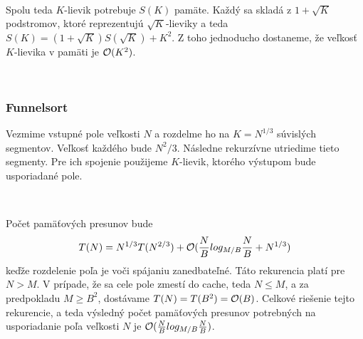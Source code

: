 \

Spolu teda $K$-lievik potrebuje $S(K)$ pamäte. Každý sa skladá z $1+\sqrt{K}$ podstromov, ktoré reprezentujú $\sqrt{K}$-lieviky a teda $S(K) = (1+\sqrt{K})S(\sqrt{K}) + K^2$. Z toho jednoducho dostaneme, že veľkosť $K$-lievika v pamäti je $\mathcal{O}(K^2)$.

\


\subsubsection{Funnelsort}

Vezmime vstupné pole veľkosti $N$ a rozdelme ho na $K = N^{1/3}$ súvislých segmentov. Veľkosť každého bude $N^2/3$. Následne rekurzívne utriedime tieto segmenty. Pre ich spojenie použijeme $K$-lievik, ktorého výstupom bude usporiadané pole.

\

Počet pamäťových presunov bude
\[
T(N) = N^{1/3}T(N^{2/3}) + \mathcal{O}(\frac{N}{B} log_{M/B} \frac{N}{B} + N^{1/3})
\]
keďže rozdelenie poľa je voči spájaniu zanedbateľné. Táto rekurencia platí pre $N > M$. V prípade, že sa cele pole zmestí do cache, teda $N \le M$, a za predpokladu $M \ge B^2$, dostávame $T(N) = T(B^2) = \mathcal{O}(B)$. Celkové riešenie tejto rekurencie, a teda výsledný počet pamäťových presunov potrebných na usporiadanie poľa veľkosti $N$ je $\mathcal{O}(\frac{N}{B} log_{M/B} \frac{N}{B})$.